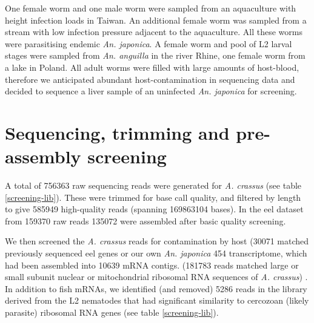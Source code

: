 One female worm and one male worm were sampled from an aquaculture
with height infection loads in Taiwan. An additional female worm was
sampled from a stream with low infection pressure adjacent to the
aquaculture. All these worms were parasitising endemic
\textit{An. japonica}. A female worm and pool of L2 larval stages were
sampled from \textit{An. anguilla} in the river Rhine, one female worm
from a lake in Poland. All adult worms were filled with large amounts
of host-blood, therefore we anticipated abundant host-contamination in
sequencing data and decided to sequence a liver sample of an
uninfected \textit{An. japonica} for screening.

\section{Sequencing, trimming and pre-assembly screening}

A total of 756363 raw sequencing reads were generated for
\textit{A. crassus} (see table \ref{screening-lib}). These were
trimmed for base call quality, and filtered by length to give 585949
high-quality reads (spanning 169863104 bases). In the eel dataset from
159370 raw reads 135072 were assembled after basic quality screening.

We then screened the \textit{A. crassus} reads for contamination by
host (30071 matched previously sequenced eel genes or our own
\textit{An. japonica} 454 transcriptome, which had been assembled into
10639 mRNA contigs. (181783 reads matched large or small subunit
nuclear or mitochondrial ribosomal RNA sequences of
\textit{A. crassus}) . In addition to fish mRNAs, we identified (and
removed) 5286 reads in the library derived from the L2 nematodes that
had significant similarity to cercozoan (likely parasite) ribosomal
RNA genes (see table \ref{screening-lib}). 

